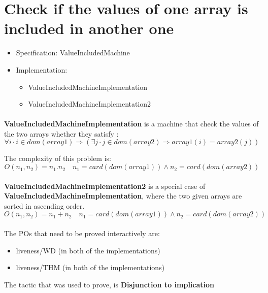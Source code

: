 \section{Check if the values of one array is included in another one}

\begin{itemize}
\item Specification: ValueIncludedMachine
\item Implementation:
\begin{itemize}
	\item ValueIncludedMachineImplementation
	\item ValueIncludedMachineImplementation2
\end{itemize}
\end{itemize}

\paragraph{}
\textbf{ValueIncludedMachineImplementation} is a machine that check the values of the two arrays whether they satisfy :
$$
\forall{i}\cdot i \in dom(array1) \Rightarrow (\exists j \cdot j \in dom(array2) \Rightarrow array1(i) = array2(j))
$$

The complexity of this problem is:
$$
O(n_{1}, n_{2}) = n_{1}. n_{2} \quad  n_{1}=card(dom(array1)) \land n_{2}=card(dom(array2))
$$
\paragraph{}
\textbf{ValueIncludedMachineImplementation2} is a special case of \textbf{ValueIncludedMachineImplementation}, where the two given arrays are sorted in ascending order. 
$$
O(n_{1}, n_{2}) = n_{1}+ n_{2} \quad  n_{1}=card(dom(array1)) \land n_{2}=card(dom(array2))
$$
\paragraph{}
The POs that need to be proved interactively are:
\begin{itemize}
\item liveness/WD (in both of the implementations)
\item liveness/THM (in both of the implementations)
\end{itemize}

The tactic that was used to prove, is \textbf{Disjunction to implication}